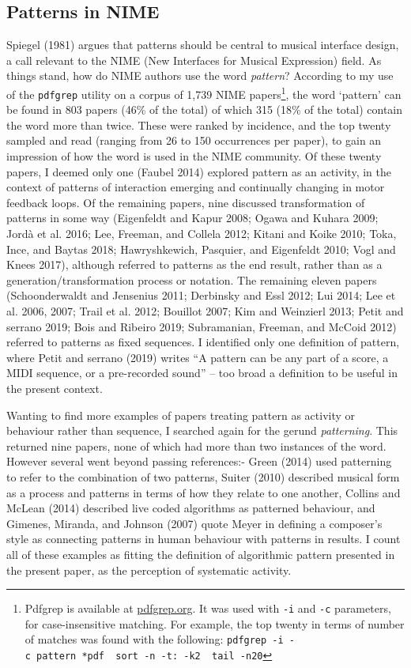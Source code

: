 \documentclass{nime-alternate} %
\begin{document}
\hypertarget{patterns-in-nime}{%
\subsection{Patterns in NIME}\label{patterns-in-nime}}

Spiegel (1981) argues that patterns should be central to musical
interface design, a call relevant to the NIME (New Interfaces for
Musical Expression) field. As things stand, how do NIME authors use the
word \emph{pattern}? According to my use of the \texttt{pdfgrep} utility
on a corpus of 1,739 NIME papers\footnote{ Pdfgrep is available at
  \href{https://pdfgrep.org/}{pdfgrep.org}. It was used with \texttt{-i}
  and \texttt{-c} parameters, for case-insensitive matching. For
  example, the top twenty in terms of number of matches was found with
  the following:
  \texttt{pdfgrep\ -i\ -c\ pattern\ *pdf\ \textbar{}\ sort\ -n\ -t:\ -k2\ \textbar{}\ tail\ -n20}},
the word `pattern' can be found in 803 papers (46\% of the total) of
which 315 (18\% of the total) contain the word more than twice. These
were ranked by incidence, and the top twenty sampled and read (ranging
from 26 to 150 occurrences per paper), to gain an impression of how the
word is used in the NIME community. Of these twenty papers, I deemed
only one (Faubel 2014) explored pattern as an activity, in the context
of patterns of interaction emerging and continually changing in motor
feedback loops. Of the remaining papers, nine discussed transformation
of patterns in some way (Eigenfeldt and Kapur 2008; Ogawa and Kuhara
2009; Jordà et al. 2016; Lee, Freeman, and Collela 2012; Kitani and
Koike 2010; Toka, Ince, and Baytas 2018; Hawryshkewich, Pasquier, and
Eigenfeldt 2010; Vogl and Knees 2017), although referred to patterns as
the end result, rather than as a generation/transformation process or
notation. The remaining eleven papers (Schoonderwaldt and Jensenius
2011; Derbinsky and Essl 2012; Lui 2014; Lee et al. 2006, 2007; Trail et
al. 2012; Bouillot 2007; Kim and Weinzierl 2013; Petit and serrano 2019;
Bois and Ribeiro 2019; Subramanian, Freeman, and McCoid 2012) referred
to patterns as fixed sequences. I identified only one definition of
pattern, where Petit and serrano (2019) writes ``A pattern can be any
part of a score, a MIDI sequence, or a pre-recorded sound'' -- too broad
a definition to be useful in the present context.

Wanting to find more examples of papers treating pattern as activity or
behaviour rather than sequence, I searched again for the gerund
\emph{patterning}. This returned nine papers, none of which had more
than two instances of the word. However several went beyond passing
references:- Green (2014) used patterning to refer to the combination of
two patterns, Suiter (2010) described musical form as a process and
patterns in terms of how they relate to one another, Collins and McLean
(2014) described live coded algorithms as patterned behaviour, and
Gimenes, Miranda, and Johnson (2007) quote Meyer in defining a
composer's style as connecting patterns in human behaviour with patterns
in results. I count all of these examples as fitting the definition of
algorithmic pattern presented in the present paper, as the perception of
systematic activity.
\end{document}
